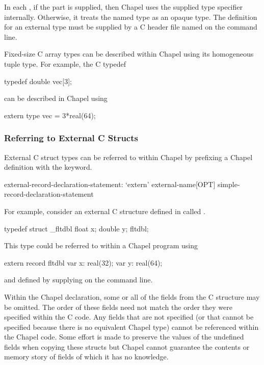 In each , if the  part is
supplied, then Chapel uses the supplied type specifier internally.  Otherwise,
it treats the named type as an opaque type.  The definition for an external type
must be supplied by a C header file named on the  command line.

Fixed-size C array types can be described within Chapel using its
homogeneous tuple type.  For example, the C typedef
\begin{chapel}
typedef double vec[3];
\end{chapel}
can be described in Chapel using
\begin{chapel}
extern type vec = 3*real(64);
\end{chapel}


\subsubsection{Referring to External C Structs}
\label{Referring_to_External_C_Structs}

External C struct types can be referred to within Chapel by prefixing
a Chapel  definition with the  keyword.
\begin{syntax}
external-record-declaration-statement:
  `extern' external-name[OPT] simple-record-declaration-statement
\end{syntax}

For example, consider an external C structure defined in  called .
\begin{chapel}
    typedef struct _fltdbl {
      float x;
      double y;
    } fltdbl;
\end{chapel}
This type could be referred to within a Chapel program using
\begin{chapel}
   extern record fltdbl {
     var x: real(32);
     var y: real(64);
   }
\end{chapel}
\noindent
and defined by supplying  on the  command line.

Within the Chapel declaration, some or all of the fields from the C
structure may be omitted.  The order of these fields need not match
the order they were specified within the C code.  Any fields that are
not specified (or that cannot be specified because there is no
equivalent Chapel type) cannot be referenced within the Chapel code.  Some
effort is made to preserve the values of the undefined fields when copying
these structs but Chapel cannot guarantee the contents or memory story of
fields of which it has no knowledge.

